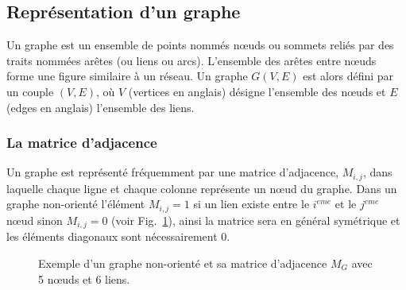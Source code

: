 \subsection{Représentation d'un graphe}
  Un graphe est un ensemble de points nommés nœuds ou sommets  reliés par des traits 
  nommées arêtes (ou liens ou arcs). L'ensemble des arêtes entre nœuds forme une figure similaire à un 
  réseau. Un  graphe $G(V,E)$ est alors défini par un couple $(V,E)$, où $V$ (vertices en anglais) désigne
  l'ensemble des nœuds et $E$ (edges en anglais) l'ensemble des liens.
 
  \subsubsection{La matrice d’adjacence}
 Un graphe est représenté fréquemment par une matrice d'adjacence, $M_{i,j}$, dans laquelle chaque ligne et
 chaque colonne représente un nœud du graphe. Dans un graphe non-orienté l'élément $M_{i,j}=1$ si un lien existe
 entre le $i^{eme}$ et le $j^{eme}$ nœud sinon $M_{i,j}=0$  (voir Fig.~\ref{matrice d'adjacence}), ainsi la matrice 
 sera en général symétrique et les éléments diagonaux sont nécessairement $0$.
  \begin{figure}[h]
 	\centering
 	\caption{Exemple d'un graphe non-orienté et sa matrice d'adjacence $M_G$ avec 5 nœuds et 6 liens.}
 	\label{matrice d'adjacence}
 \end{figure}  
 

